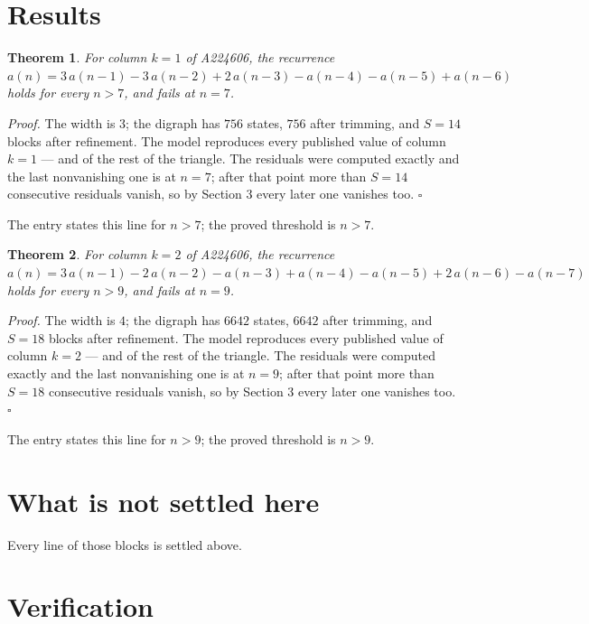 \documentclass[11pt]{article}
\newtheorem{theorem}{Theorem}
\theoremstyle{definition}
\begin{document}
\section{Results}

\begin{theorem} For column $k = 1$ of A224606, the recurrence $a(n) = 3\,a(n-1) - 3\,a(n-2) + 2\,a(n-3) - a(n-4) - a(n-5) + a(n-6)$ holds for every $n > 7$, and fails at $n = 7$.\end{theorem}

{\itshape Proof.} The width is $3$; the digraph has $756$ states, $756$ after trimming, and $S = 14$ blocks after refinement. The model reproduces every published value of column $k = 1$ --- and of the rest of the triangle. The residuals were computed exactly and the last nonvanishing one is at $n = 7$; after that point more than $S = 14$ consecutive residuals vanish, so by Section 3 every later one vanishes too. $\square$

The entry states this line for $n > 7$; the proved threshold is $n > 7$.

\begin{theorem} For column $k = 2$ of A224606, the recurrence $a(n) = 3\,a(n-1) - 2\,a(n-2) - a(n-3) + a(n-4) - a(n-5) + 2\,a(n-6) - a(n-7)$ holds for every $n > 9$, and fails at $n = 9$.\end{theorem}

{\itshape Proof.} The width is $4$; the digraph has $6642$ states, $6642$ after trimming, and $S = 18$ blocks after refinement. The model reproduces every published value of column $k = 2$ --- and of the rest of the triangle. The residuals were computed exactly and the last nonvanishing one is at $n = 9$; after that point more than $S = 18$ consecutive residuals vanish, so by Section 3 every later one vanishes too. $\square$

The entry states this line for $n > 9$; the proved threshold is $n > 9$.

\section{What is not settled here}

Every line of those blocks is settled above.

\section{Verification}
\end{document}
